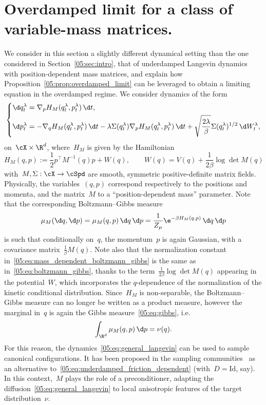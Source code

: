 \section{Overdamped limit for a class of variable-mass matrices.}
\label{05:sec:mass_matrices}
We consider in this section a slightly different dynamical setting than the one considered in Section~\ref{05:sec:intro}, that of underdamped Langevin dynamics with position-dependent mass matrices, and explain how Proposition~\ref{05:prop:overdamped_limit} can be leveraged to obtain a limiting equation in the overdamped regime.
We consider dynamics of the form
\begin{equation}
    \label{05:eq:general_langevin}
    \left\{\begin{aligned}
    \d q_t^\lambda &= \nabla_p H_M(q_t^\lambda,p_t^\lambda)\,\d t,\\
    \d p_t^\lambda &= -\nabla_q H_M(q_t^\lambda,p_t^\lambda)\,\d t -\lambda\Sigma(q_t^\lambda)\nabla_p H_M(q_t^\lambda,p_t^\lambda)\,\d t + \sqrt{\frac{2\lambda}{\beta}}\Sigma(q_t^\lambda)^{1/2}\,\d W_t^\lambda,
    \end{aligned}\right.
\end{equation}
on~$\cX\times\R^d$, where~$H_M$ is given by the Hamiltonian
\begin{equation}
    \label{05:eq:modified_hamiltonian}
    H_M(q,p) := \frac12 p^\top M^{-1}(q) p + W(q),\qquad W(q)=V(q) +\frac1{2\beta} \log\det M(q)
\end{equation}
with~$M,\Sigma:\cX\to\cSpd$ are smooth, symmetric positive-definite matrix fields. Physically, the variables~$(q,p)$ correspond respectively to the positions and momenta, and the matrix~$M$ to a ``position-dependent mass'' parameter. Note that the corresponding Boltzmann--Gibbs measure
\begin{equation}
    \label{05:eq:mass_dependent_boltzmann_gibbs}
    \mu_M(\d q,\d p) = \mu_M(q,p)\,\d q\,\d p = \frac1{Z_{\mu}}\e^{-\beta H_M(q,p)}\,\d q\,\d p
\end{equation}
is such that conditionally on~$q$, the momentum~$p$ is again Gaussian, with a covariance matrix~$\frac{1}{\beta}M(q)$. Note also that the normalization constant in~\eqref{05:eq:mass_dependent_boltzmann_gibbs} is the same as in~\eqref{05:eq:boltzmann_gibbs}, thanks to the term~$\frac1{2\beta}\log\det M(q)$ appearing in the potential~$W$, which incorporates the $q$-dependence of the normalization of the kinetic conditional distribution.
Since~$H_M$ is non-separable, the Boltzmann--Gibbs measure can no longer be written as a product measure, however the marginal in~$q$ is again the Gibbs measure~\eqref{05:eq:gibbs}, i.e.
\begin{equation}
    \int_{\R^d}\mu_M(q,p)\,\d p = \nu(q).
\end{equation}
For this reason, the dynamics~\eqref{05:eq:general_langevin} can be used to sample canonical configurations. It has been proposed in the sampling communities~ as an alternative to~\eqref{05:eq:underdamped_friction_dependent} (with~$D=\mathrm{Id}$, say). In this context,~$M$ plays the role of a preconditioner, adapting the diffusion~\eqref{05:eq:general_langevin} to local anisotropic features of the target distribution~$\nu$.

